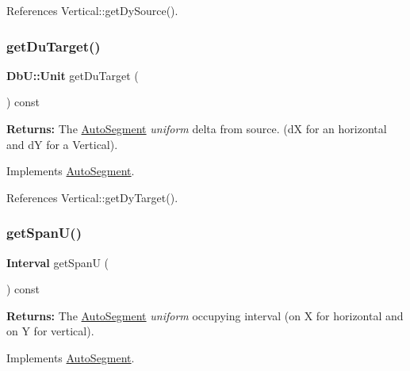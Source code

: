 References Vertical\+::get\+Dy\+Source().

\mbox{\label{classKatabatic_1_1AutoVertical_a76e349c14c904b3300a15caa1ee8b680}} 
\subsubsection{\texorpdfstring{get\+Du\+Target()}{getDuTarget()}}
{\footnotesize\ttfamily \textbf{ Db\+U\+::\+Unit} get\+Du\+Target (\begin{DoxyParamCaption}{ }\end{DoxyParamCaption}) const\hspace{0.3cm}{\ttfamily [virtual]}}

{\bfseries Returns\+:} The \mbox{\hyperlink{classKatabatic_1_1AutoSegment}{Auto\+Segment}} {\itshape uniform} delta from source. (dX for an horizontal and dY for a Vertical). 

Implements \mbox{\hyperlink{classKatabatic_1_1AutoSegment_a0644d656eedc71dba2fb3c6c0d83ed3f}{Auto\+Segment}}.



References Vertical\+::get\+Dy\+Target().

\mbox{\label{classKatabatic_1_1AutoVertical_a0b5ac47ab175815e1a9bc07f2517614a}} 
\subsubsection{\texorpdfstring{get\+Span\+U()}{getSpanU()}}
{\footnotesize\ttfamily \textbf{ Interval} get\+SpanU (\begin{DoxyParamCaption}{ }\end{DoxyParamCaption}) const\hspace{0.3cm}{\ttfamily [virtual]}}

{\bfseries Returns\+:} The \mbox{\hyperlink{classKatabatic_1_1AutoSegment}{Auto\+Segment}} {\itshape uniform} occupying interval (on X for horizontal and on Y for vertical). 

Implements \mbox{\hyperlink{classKatabatic_1_1AutoSegment_a248eb2fbb06e3286650b28567d495f0b}{Auto\+Segment}}.



